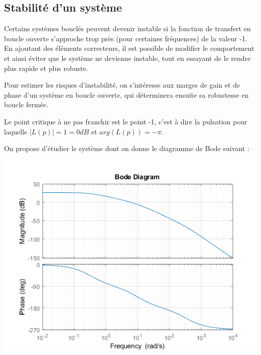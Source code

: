 \subsection*{Stabilité d'un système}

Certains systèmes bouclés peuvent devenir instable si la fonction de transfert en boucle ouverte s'approche trop près (pour certaines fréquences) de la valeur -1. En ajoutant des éléments correcteurs, il est possible de modifier le comportement et ainsi éviter que le système ne devienne instable, tout en essayant de le rendre plus rapide et plus robuste. 

Pour estimer les risques d'instabilité, on s'intéresse aux marges de gain et de phase d'un système en boucle ouverte, qui déterminera ensuite sa robustesse en boucle fermée.

Le point critique à ne pas franchir est le point -1, c'est à dire la pulsation pour laquelle $\lvert L(p) \rvert = 1 = 0dB$ et $arg(L(p)) = -\pi$.

On propose d'étudier le système dont on donne le diagramme de Bode suivant :

\begin{center}
	\includegraphics[width=15cm]{images/TD/sys_stable2.png}
\end{center}

